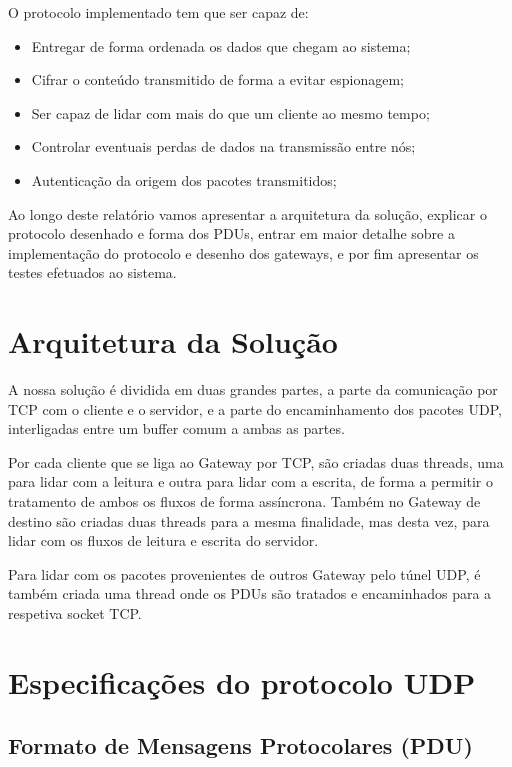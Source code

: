 \documentclass[a4paper]{report}
\begin{document}
O protocolo implementado tem que ser capaz de: 

\begin{itemize}
        \item Entregar de forma ordenada os dados que chegam ao sistema;
        \item Cifrar o conteúdo transmitido de forma a evitar espionagem;
        \item Ser capaz de lidar com mais do que um cliente ao mesmo tempo;
        \item Controlar eventuais perdas de dados na transmissão entre nós;
        \item Autenticação da origem dos pacotes transmitidos;
\end{itemize}

Ao longo deste relatório vamos apresentar a arquitetura da solução, explicar
o protocolo desenhado e forma dos PDUs, entrar em maior detalhe sobre a
implementação do protocolo e desenho dos gateways, e por fim apresentar os
testes efetuados ao sistema.

\chapter{Arquitetura da Solução}

A nossa solução é dividida em duas grandes partes, a parte da comunicação
por TCP com o cliente e o servidor, e a parte do encaminhamento dos pacotes
UDP, interligadas entre um buffer comum a ambas as partes.

Por cada cliente que se liga ao Gateway por TCP, são criadas duas threads, 
uma para lidar com a leitura e outra para lidar com a escrita, de forma
a permitir o tratamento de ambos os fluxos de forma assíncrona. Também no
Gateway de destino são criadas duas threads para a mesma finalidade, mas 
desta vez, para lidar com os fluxos de leitura e escrita do servidor.

Para lidar com os pacotes provenientes de outros Gateway pelo túnel UDP,
é também criada uma thread onde os PDUs são tratados e encaminhados
para a respetiva socket TCP.

\chapter{Especificações do protocolo UDP}
\section{Formato de Mensagens Protocolares (PDU)}
\end{document}
